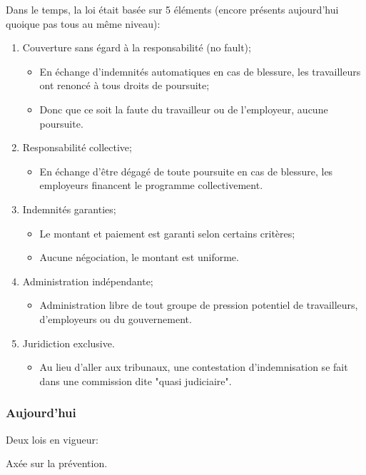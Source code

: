 \documentclass[10pt, french]{article}
\begin{document}
\begin{multicols*}{3}
Dans le temps, la loi était basée sur 5 éléments (encore présents aujourd'hui quoique pas tous au même niveau):
\begin{enumerate}
	\item	Couverture sans égard à la responsabilité (no fault);
		\begin{itemize}[leftmargin = *]
		\item	En échange d'indemnités automatiques en cas de blessure, les travailleurs ont renoncé à tous droits de poursuite;
		\item	Donc que ce soit la faute du travailleur ou de l'employeur, aucune poursuite.
		\end{itemize}
	\item	Responsabilité collective;
		\begin{itemize}[leftmargin = *]
		\item	En échange d'être dégagé de toute poursuite en cas de blessure, les employeurs financent le programme collectivement.
		\end{itemize}
	\item	Indemnités garanties;
		\begin{itemize}[leftmargin = *]
		\item	Le montant et paiement est garanti selon certains critères;
		\item	Aucune négociation, le montant est uniforme.
		\end{itemize}
	\item	Administration indépendante;
		\begin{itemize}[leftmargin = *]
		\item	Administration libre de tout groupe de pression potentiel de travailleurs, d'employeurs ou du gouvernement.
		\end{itemize}
	\item	Juridiction exclusive.
		\begin{itemize}[leftmargin = *]
		\item	Au lieu d'aller aux tribunaux, une contestation d'indemnisation se fait dans une commission dite "quasi judiciaire".
		\end{itemize}
\end{enumerate}


\subsubsection*{Aujourd'hui}
Deux lois en vigueur:

\begin{rappel_enhanced}
Axée sur la prévention.
\end{rappel_enhanced}


\end{multicols*}
\end{document}
